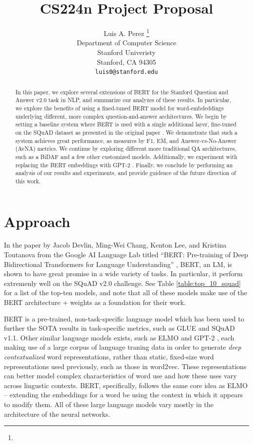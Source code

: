 \documentclass{article}
\title{CS224n Project Proposal}
\author{
  Luis A. Perez \thanks{} \\
  Department of Computer Science\\
  Stanford Univeristy\\
  Stanford, CA 94305 \\
  \texttt{luis0@stanford.edu} \\
}
\begin{document}

\maketitle

\begin{abstract}
  In this paper, we explore several extensions of BERT for the Stanford Question and Answer v2.0 task in NLP, and summarize our analyzes of these results. In particular, we explore the benefits of using a fined-tuned BERT model for word-embdeddings underlying different, more complex question-and-answer architectures. We begin by setting a baseline system where BERT is used with a single additional layer, fine-tuned on the SQuAD dataset as presented in the original paper \cite{BERT}. We demonstrate that such a system achieves great performance, as measures by F1, EM, and Answer-vs-No-Answer (AvNA) metrics. We continue by exploring different more traditional QA architectures, such as a BiDAF and a few other customized models. Additionally, we experiment with replacing the BERT embeddings with GPT-2 \cite{GPT2}. Finally, we conclude by performing an analysis of our results and experiments, and provide guidence of the future direction of this work.
\end{abstract}

\section{Approach}
In the paper by Jacob Devlin, Ming-Wei Chang, Kenton Lee, and Kristina Toutanova from the Google AI Language Lab titled ``BERT: Pre-training of Deep Bidirectional Transformers for Language Understanding'' \cite{BERT}, BERT, an LM, is shown to have great promise in a wide variety of tasks. In particular, it perform extremenly well on the SQuAD v2.0 challenge. See Table \ref{table:top_10_squad} for a list of the top-ten models, and note that all of these models make use of the BERT architecture + weights as a foundation for their work. 

BERT is a pre-trained, non-task-specific language model which has been used to further the SOTA results in task-specific metrics, such as GLUE and SQuAD v1.1. Other similar language models exists, such as ELMO \cite{ELMO} and GPT-2 \cite{GPT2}, each making use of a large corpus of language traning data in order to generate \textit{deep contextualized} word representations, rather than static, fixed-size word representations used previously, such as those in word2vec. These representations can better model complex characteristics of word use and how these uses vary across lingustic contexts. BERT, specifically, follows the same core idea as ELMO -- extending the embeddings for a word be using the context in which it appears to modify them. All of these large language models vary mostly in the architecture of the neural networks.  
\end{document}

